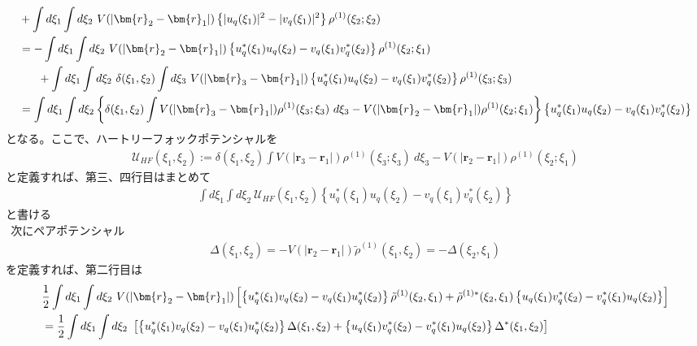 \documentclass[dvipdfmx, 11pt, a4paper]{jsarticle}
\numberwithin{equation}{section}
\theoremstyle{definition}
\begin{document}
\begin{derivationBox}
\begin{align}
            &+  \int d\xi_1\int  d\xi_2\ V(\left| \bm{r}_2-\bm{r}_1 \right|) \left\{  |u_q(\xi_1)|^2-|v_q(\xi_1)|^2 \right\}\rho^{(1)}(\xi_2;\xi_2)  \notag \\
            &=-   \int d\xi_1 \int d\xi_2\ V(\left| \bm{r}_2-\bm{r}_1 \right|) \left\{ u_{q}^*(\xi_1)u_{q}(\xi_2)-v_{q}(\xi_1)v_{q}^*(\xi_2) \right\} \rho^{(1)}(\xi_2;\xi_1)    \notag \\
            &\ \ \ \ \ +  \int d\xi_1 \int d\xi_2\ \delta(\xi_1,\xi_2)\int d\xi_3\ V(\left| \bm{r}_3-\bm{r}_1 \right|) \left\{  u_q^*(\xi_1)u_q(\xi_2)-v_q(\xi_1)v_q^*(\xi_2) \right\}\rho^{(1)}(\xi_3;\xi_3)   \notag \\
            &= \int d\xi_1 \int d\xi_2 \left\{ \delta(\xi_1,\xi_2) \int  V(\left| \bm{r}_3-\bm{r}_1 \right|)\rho^{(1)}(\xi_3;\xi_3)\ d\xi_3 -V(\left| \bm{r}_2-\bm{r}_1 \right|) \rho^{(1)}(\xi_2;\xi_1) \right\} \left\{  u_q^*(\xi_1)u_q(\xi_2)-v_q(\xi_1)v_q^*(\xi_2) \right\}
        \end{align}
        となる。ここで、ハートリーフォックポテンシャルを
        \begin{align}
            \mathcal{U}_{HF}(\xi_1,\xi_2) := \delta(\xi_1,\xi_2) \int  V(\left| \bm{r}_3-\bm{r}_1 \right|)\rho^{(1)}(\xi_3;\xi_3)\ d\xi_3 -V(\left| \bm{r}_2-\bm{r}_1 \right|) \rho^{(1)}(\xi_2;\xi_1)
        \end{align}
        と定義すれば、第三、四行目はまとめて
        \begin{align}
            \int d\xi_1 \int d\xi_2\ \mathcal{U}_{HF}(\xi_1,\xi_2) \left\{  u_q^*(\xi_1)u_q(\xi_2)-v_q(\xi_1)v_q^*(\xi_2) \right\}
        \end{align}
        と書ける\\
        $\ \ $次にペアポテンシャル
        \begin{align}
            \Delta (\xi_1,\xi_2) = -V(|\bm{r}_2-\bm{r}_1|)\tilde{\rho}^{(1)}(\xi_1,\xi_2) = -\Delta (\xi_2,\xi_1)
        \end{align}
        を定義すれば、第二行目は
        \begin{align}
            &\frac{1}{2} \int d\xi_1 \int d\xi_2\ V(\left| \bm{r}_2-\bm{r}_1 \right|) \left[ \left\{ u_q^*(\xi_1) v_q(\xi_2) - v_q(\xi_1) u_q^*(\xi_2)\right\} \tilde{\rho}^{(1)}(\xi_2,\xi_1) +  \tilde{\rho}^{(1)*}(\xi_2,\xi_1)\left\{   u_q(\xi_1)v^*_q(\xi_2) - v^*_q(\xi_1)u_q(\xi_2)   \right\} \right] \notag \\
            &= \frac{1}{2} \int d\xi_1 \int d\xi_2\  \left[ \left\{ u_q^*(\xi_1) v_q(\xi_2) - v_q(\xi_1) u_q^*(\xi_2)\right\} \Delta (\xi_1,\xi_2) +  \left\{   u_q(\xi_1)v^*_q(\xi_2) - v^*_q(\xi_1)u_q(\xi_2)   \right\}\Delta^* (\xi_1,\xi_2) \right] \notag \\

\end{align}
\end{derivationBox}
\end{document}
